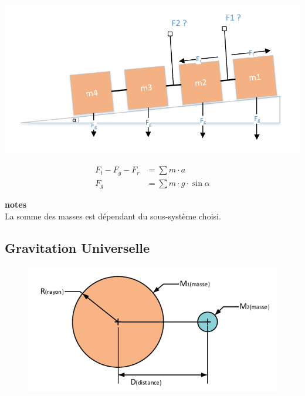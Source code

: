 \documentclass[12pt,a4paper]{article} %
\newcommand\framenote[1]{
	{\small {\bfseries notes} \\ #1}
}
\begin{document}
\begin{twocols}[0.5][0.5]
	\includegraphics[width=1\textwidth]{Newton-Traction}
\nextcol

	\begin{align*}
		F_t - F_g - F_r &= \sum m \cdot a \\
			F_g &= \sum m \cdot g \cdot \sin \alpha
	\end{align*}

	\framenote{La somme des masses est dépendant du sous-système choisi.}

\end{twocols}

\newpage

\subsection{Gravitation Universelle}

	\begin{figure}[h]
		\centering
		\includegraphics{Newton-Gravitation-1Planete}
	\end{figure}
\end{document}
